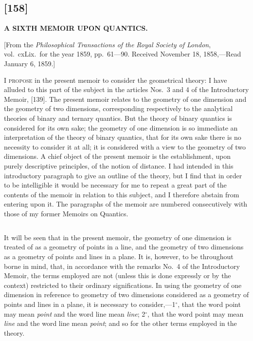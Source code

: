 \documentclass[11pt,a4paper]{book}
\begin{document}
\begin{center}
\newpage
\section*{[158]}

\begin{center}
\Large\textbf{A SIXTH MEMOIR UPON QUANTICS.}
\end{center}

\begin{center}
\small[From the \textit{Philosophical Transactions of the Royal Society of London}, vol.~cxLix.\ for the year 1859, pp.~61---90. Received November 18, 1858,---Read January 6, 1859.]
\end{center}

\textsc{I propose} in the present memoir to consider the geometrical theory: I have alluded to this part of the subject in the articles Nos.~3 and 4 of the Introductory Memoir, [139]. The present memoir relates to the geometry of one dimension and the geometry of two dimensions, corresponding respectively to the analytical theories of binary and ternary quantics. But the theory of binary quantics is considered for its own sake; the geometry of one dimension is so immediate an interpretation of the theory of binary quantics, that for its own sake there is no necessity to consider it at all; it is considered with a view to the geometry of two dimensions. A chief object of the present memoir is the establishment, upon purely descriptive principles, of the notion of distance. I had intended in this introductory paragraph to give an outline of the theory, but I find that in order to be intelligible it would be necessary for me to repeat a great part of the contents of the memoir in relation to this subject, and I therefore abstain from entering upon it. The paragraphs of the memoir are numbered consecutively with those of my former Memoirs on Quantics.

\setcounter{subsection}{146}

\subsection{}

It will be seen that in the present memoir, the geometry of one dimension is treated of as a geometry of points in a line, and the geometry of two dimensions as a geometry of points and lines in a plane. It is, however, to be throughout borne in mind, that, in accordance with the remarks No.~4 of the Introductory Memoir, the terms employed are not (unless this is done expressly or by the context) restricted to their ordinary significations. In using the geometry of one dimension in reference to geometry of two dimensions considered as a geometry of points and lines in a plane, it is necessary to consider,---1$^\circ$, that the word point may mean \textit{point} and the word line mean \textit{line}; 2$^\circ$, that the word point may mean \textit{line} and the word line mean \textit{point}; and so for the other terms employed in the theory.


\end{center}
\end{document}
